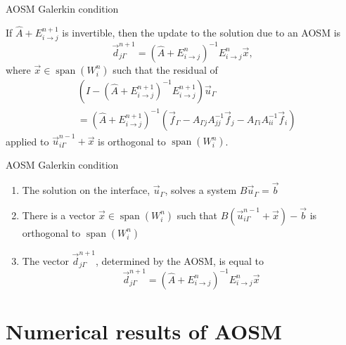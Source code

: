 \documentclass{beamer}
\newcommand{\Aij}{\left ( \hat{A} + E_{i \to j}^{n} \right )^{-1}}
\newcommand{\AijE}{\Aij E_{i \to j}^{n}}
\DeclareMathOperator{\Span}{span}
\begin{document}
\begin{frame}{AOSM Galerkin condition}

\begin{theorem} \label{thm: opt}
If $\hat{A} + E_{i \to j}^{n+1}$ is invertible, then the update to the solution due to an AOSM is $$\vec{d}_{j \Gamma}^{n+1} = \AijE \vec{x},$$ where
$\vec{x} \in  \Span(W_i^n)$ such that the residual of
\begin{align*}
	& \left ( I - \left ( \hat{A} + E_{i \to j}^{n+1} \right )^{-1} E_{i \to j}^{n+1} \right ) \vec{u}_\Gamma \\
	& = \left ( \hat{A} + E_{i \to j}^{n+1} \right )^{-1} \left ( \vec{f}_\Gamma - A_{\Gamma j} A_{jj}^{-1} \vec{f}_j - A_{\Gamma i} A_{ii}^{-1} \vec{f}_i \right )
\end{align*}
applied to $\vec{u}_{i \Gamma}^{n-1} + \vec{x}$ is orthogonal to $\Span(W_i^n)$. 
\end{theorem}
\end{frame}

\begin{frame}{AOSM Galerkin condition}

\begin{enumerate}
\item The solution on the interface, $\vec{u}_\Gamma$, solves a system $B \vec{u}_\Gamma = \vec{b}$
\item There is a vector $\vec{x} \in \Span(W_i^n)$ such that $B(\vec{u}_{i \Gamma}^{n-1} + \vec{x}) - \vec{b}$ is orthogonal to $\Span(W_i^n)$
\item The vector $\vec{d}_{j \Gamma}^{n+1}$, determined by the AOSM, is equal to $$\vec{d}_{j \Gamma}^{n+1} = \AijE \vec{x}$$
\end{enumerate}
\end{frame}

\section{Numerical results of AOSM}
\end{document}
